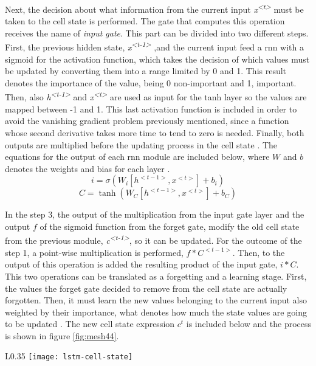 	Next, the decision about what information from the current input \textit{x\textsuperscript{<t>}} must be taken to the cell state is performed. The gate that computes this operation receives the name of \textit{input gate}. This part can be divided into two different steps. First, the previous hidden state, \textit{x\textsuperscript{<t-1>}} ,and the current input feed a \acrshort{rnn} with a sigmoid for the activation function, which takes the decision of which values must be updated by converting them into a range limited by 0 and 1. This result denotes the importance of the value, being 0 non-important and 1, important. Then, also \textit{h\textsuperscript{<t-1>}} and \textit{x\textsuperscript{<t>}} are used as input for the \acrshort{tanh} layer so the values are mapped between -1 and 1. This last activation function is included in order to avoid the vanishing gradient problem previously mentioned, since a function whose second derivative takes more time to tend to zero is needed. Finally, both outputs are multiplied before the updating process in the cell state \cite{Nguyen2018}. The equations for the output of each \acrshort{rnn} module are included below, where $W$ and $b$ denotes the weights and bias for each layer \cite{Olah2015}.
	\[ i = \sigma(W_{i}[h^{<t-1>}, x^{<t>}] + b_{i}) \]
	\[ C = \tanh(W_{C}[h^{<t-1>}, x^{<t>}] + b_{C}) \]
	
	In the step 3, the output of the multiplication from the input gate layer and the output $f$ of the sigmoid function from the forget gate, modify the old cell state from the previous module, \textit{c\textsuperscript{<t-1>}}, so it can be updated. For the outcome of the step 1, a point-wise multiplication is performed, $f * C^{<t-1>}$. Then, to the output of this operation is added the resulting product of the input gate, $i * C$. This two operations can be translated as a forgetting and a learning stage. First, the values the forget gate decided to remove from the cell state are actually forgotten. Then, it must learn the new values belonging to the current input also weighted by their importance, what denotes how much the state values are going to be updated \cite{Olah2015}. The new cell state expression $c^{t}$ is included below and the process is shown in figure \ref{fig:mesh44}.
	
	\begin{wrapfigure}[3]{L}{0.35\textwidth}
		\centering
		\captionsetup{justification=centering}
		\texttt{[image: lstm-cell-state]}
		\caption{Cell state}
		\label{fig:mesh44}
	\end{wrapfigure}
	
